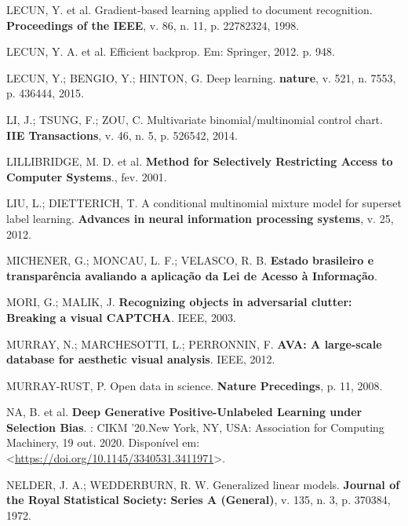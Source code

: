\documentclass[12pt,twoside,brazilian]{book}
\newlength{\cslhangindent}
\newlength{\cslentryspacingunit} %
\newenvironment{CSLReferences}[2] %
 {%
  \setlength{\parindent}{0pt}
  \ifodd #1
  \let\oldpar\par
  \def\par{\hangindent=\cslhangindent\oldpar}
  \fi
  \setlength{\parskip}{#2\cslentryspacingunit}
 }%
 {}
\begin{document}
\begin{CSLReferences}{0}{1}
\leavevmode{}%
LECUN, Y. et al. Gradient-based learning applied to document
recognition. \textbf{Proceedings of the IEEE}, v. 86, n. 11, p.
22782324, 1998.

\leavevmode{}%
LECUN, Y. A. et al. Efficient backprop. Em: Springer, 2012. p. 948.

\leavevmode{}%
LECUN, Y.; BENGIO, Y.; HINTON, G. Deep learning. \textbf{nature}, v.
521, n. 7553, p. 436444, 2015.

\leavevmode{}%
LI, J.; TSUNG, F.; ZOU, C. Multivariate binomial/multinomial control
chart. \textbf{IIE Transactions}, v. 46, n. 5, p. 526542, 2014.

\leavevmode{}%
LILLIBRIDGE, M. D. et al. \textbf{Method for Selectively Restricting
Access to Computer Systems}., fev. 2001.

\leavevmode{}%
LIU, L.; DIETTERICH, T. A conditional multinomial mixture model for
superset label learning. \textbf{Advances in neural information
processing systems}, v. 25, 2012.

\leavevmode{}%
MICHENER, G.; MONCAU, L. F.; VELASCO, R. B. \textbf{Estado brasileiro e
transparência avaliando a aplicação da Lei de Acesso à Informação}.

\leavevmode{}%
MORI, G.; MALIK, J. \textbf{Recognizing objects in adversarial clutter:
Breaking a visual CAPTCHA}. IEEE, 2003.

\leavevmode{}%
MURRAY, N.; MARCHESOTTI, L.; PERRONNIN, F. \textbf{AVA: A large-scale
database for aesthetic visual analysis}. IEEE, 2012.

\leavevmode{}%
MURRAY-RUST, P. Open data in science. \textbf{Nature Precedings}, p. 11,
2008.

\leavevmode{}%
NA, B. et al. \textbf{Deep Generative Positive-Unlabeled Learning under
Selection Bias}. : CIKM '20.New York, NY, USA: Association for Computing
Machinery, 19 out. 2020. Disponível em:
\textless{}\url{https://doi.org/10.1145/3340531.3411971}\textgreater.

\leavevmode{}%
NELDER, J. A.; WEDDERBURN, R. W. Generalized linear models.
\textbf{Journal of the Royal Statistical Society: Series A (General)},
v. 135, n. 3, p. 370384, 1972.


\end{CSLReferences}
\end{document}
